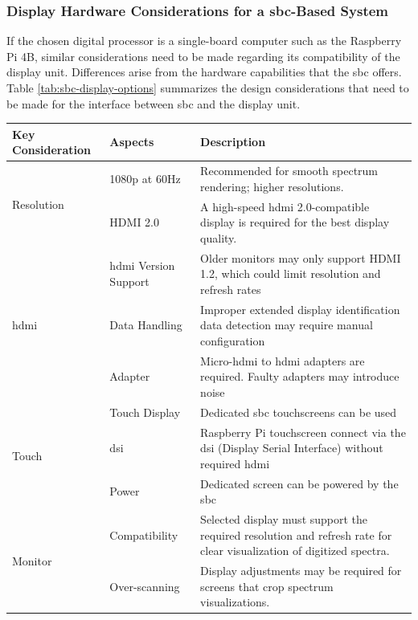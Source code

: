 \documentclass[class=report,11pt,crop=false]{standalone}
\begin{document}
	\subsubsection{Display Hardware Considerations for a \acrshort{sbc}-Based System}
	
	If the chosen digital processor is a single-board computer such as the Raspberry Pi 4B, similar considerations need to be made regarding its compatibility of the display unit. Differences arise from the hardware capabilities that the \acrshort{sbc} offers. Table \ref{tab:sbc-display-options} summarizes the design considerations that need to be made for the interface between \acrshort{sbc} and the display unit.
	
	\begin{table}[ht!]
		\centering
		\begin{tabular}{|m{5em}|m{10em}|m{24em}|}
			\hline
			\textbf{Key Consideration}	&	\textbf{Aspects}	& \textbf{Description}\\
			\hline
			\multirow{2}{*}{Resolution} 
			& 1080p at 60Hz & Recommended for smooth spectrum rendering; higher resolutions. \\
			\cline{2-3}
			& HDMI 2.0 & A high-speed \acrshort{hdmi} 2.0-compatible display is required for the best display quality. \\
			\hline
			
			\multirow{3}{*}{\acrshort{hdmi}} 
			& \acrshort{hdmi} Version Support & Older monitors may only support HDMI 1.2, which could limit resolution and refresh rates \\
			\cline{2-3}
			& Data Handling & Improper extended display identification data detection may require manual configuration \\
			\cline{2-3}
			& Adapter	& Micro-\acrshort{hdmi} to \acrshort{hdmi} adapters are required. Faulty adapters may introduce noise\\
			\hline
			
			\multirow{3}{*}{Touch} 
			& Touch Display & Dedicated \acrshort{sbc} touchscreens can be used \\
			\cline{2-3}
			& \acrshort{dsi} & Raspberry Pi touchscreen connect via the \acrshort{dsi} (Display Serial Interface) without required \acrshort{hdmi}\\
			\cline{2-3}
			& Power & Dedicated screen can be powered by the \acrshort{sbc}\\
			\hline
			
			\multirow{2}{*}{Monitor} 
			& Compatibility & Selected display must support the required resolution and refresh rate for clear visualization of digitized spectra. \\
			\cline{2-3}
			& Over-scanning & Display adjustments may be required for screens that crop spectrum visualizations. \\
			\hline
						

\end{tabular}
\end{table}
\end{document}
